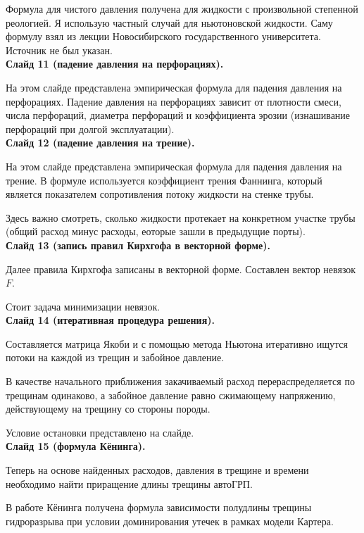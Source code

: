 \documentclass[a4paper, 12pt]{article}
\begin{document}
Формула для чистого давления получена для жидкости с произвольной степенной реологией.
Я использую частный случай для ньютоновской жидкости.
Саму формулу взял из лекции Новосибирского государственного университета.
Источник не был указан.\\

\textbf{Слайд 11 (падение давления на перфорациях).}

На этом слайде представлена эмпирическая формула для падения давления на перфорациях.
Падение давления на перфорациях зависит от плотности смеси, числа перфораций, диаметра перфораций и коэффициента эрозии (изнашивание перфораций при долгой эксплуатации).\\

\textbf{Слайд 12 (падение давления на трение).}

На этом слайде представлена эмпирическая формула для падения давления на трение.
В формуле используется коэффициент трения Фаннинга, который является показателем сопротивления потоку жидкости на стенке трубы.

Здесь важно смотреть, сколько жидкости протекает на конкретном участке трубы (общий расход минус расходы, еоторые зашли в предыдущие порты).\\

\textbf{Слайд 13 (запись правил Кирхгофа в векторной форме).}

Далее правила Кирхгофа записаны в векторной форме.
Составлен вектор невязок $F$.

Стоит задача минимизации невязок.\\

\textbf{Слайд 14 (итеративная процедура решения).}

Составляется матрица Якоби и с помощью метода Ньютона итеративно ищутся потоки на каждой из трещин и забойное давление.

В качестве начального приближения закачиваемый расход перераспределяется по трещинам одинаково, а забойное давление равно сжимающему напряжению, действующему на трещину со стороны породы.

Условие остановки представлено на слайде.\\

\textbf{Слайд 15 (формула Кёнинга).}

Теперь на основе найденных расходов, давления в трещине и времени необходимо найти приращение длины трещины автоГРП.

В работе Кёнинга получена формула зависимости полудлины трещины гидроразрыва при условии доминирования утечек в рамках модели Картера.
\end{document}
